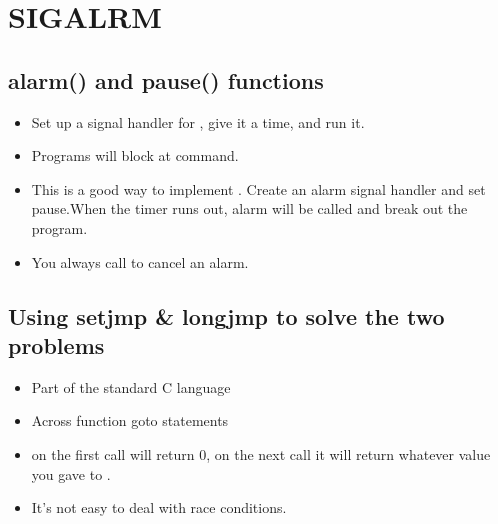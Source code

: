 \documentclass[]{article}
\begin{document}
\section{SIGALRM}
\subsection{alarm() and pause() functions}
\begin{itemize}
\item Set up a signal handler for , give it a time, and run it.
\item Programs will block at  command.
\item This is a good way to implement . Create an alarm signal
handler and set pause.When the timer runs out, alarm will be called and break
out the program.
\item You always call  to cancel an alarm.
\end{itemize}

\subsection{Using setjmp \& longjmp to solve the two problems}
\begin{itemize}
\item Part of the standard C language
\item Across function goto statements
\item {} on the first call will return 0, on the next call it will
return whatever value you gave to .
\item It's not easy to deal with race conditions.
\end{itemize}
\end{document}
